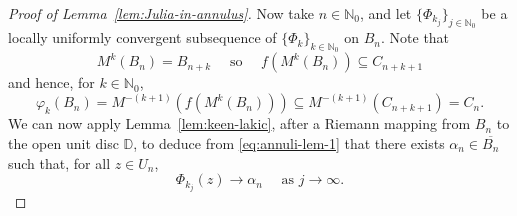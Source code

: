 \documentclass[a4paper, 12pt, reqno]{amsart}
\numberwithin{equation}{section}
\theoremstyle{plain}
\theoremstyle{definition}
\theoremstyle{remark}
\newcommand{\N}{{\mathbb{N}}}
\begin{document}
\begin{proof}[Proof of Lemma~\ref{lem:Julia-in-annulus}]
Now take $n\in\N_0$, and let $\{\Phi_{k_j}\}_{j\in\N_0}$ be a locally uniformly convergent subsequence of $\{\Phi_k\}_{k\in\N_0}$ on $B_n$. Note that
$$
M^k(B_n)=B_{n+k} \quad \mbox{ so } \quad f(M^k(B_n))\subseteq C_{n+k+1}
$$
and hence, for $k\in \N_0$, 
$$
\varphi_k(B_n)=M^{-(k+1)}(f(M^k(B_n)))\subseteq M^{-(k+1)}(C_{n+k+1})=C_n.
$$
We can now apply Lemma~\ref{lem:keen-lakic}, after a Riemann mapping from $B_n$ to the open unit disc $\mathbb D$, to deduce from \eqref{eq:annuli-lem-1} that there exists $\alpha_n\in \overline{B_n}$ such that, for all $z\in U_n$,
$$
\Phi_{k_j}(z)\to\alpha_n\quad \mbox{ as } j\to\infty.
$$






\end{proof}
\end{document}
